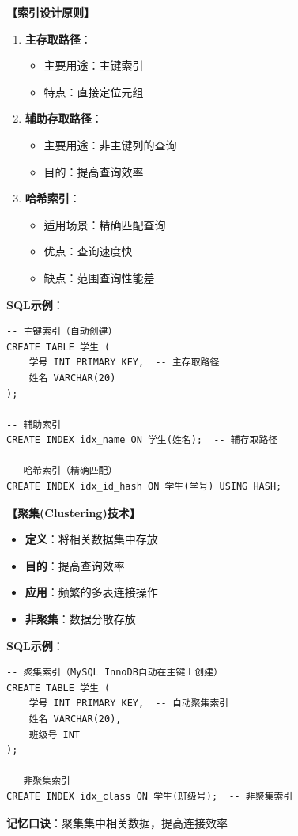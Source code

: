 \documentclass[12pt, a4paper]{article}
\newenvironment{bluebox}[1]{%
  \begin{trivlist}
  \item[\hskip\labelsep \textbf{#1}]
  \setlength{\parskip}{0.5ex}
  \setlength{\itemsep}{0.5ex}
}{%
  \end{trivlist}
  }
\begin{document}
\begin{bluebox}{索引设计}
	\textbf{【索引设计原则】}

	\begin{enumerate}[leftmargin=*, label=\textbf{\arabic*.}]
		\item \textbf{主存取路径}：
		      \begin{itemize}[nosep]
			      \item 主要用途：主键索引
			      \item 特点：直接定位元组
		      \end{itemize}

		\item \textbf{辅助存取路径}：
		      \begin{itemize}[nosep]
			      \item 主要用途：非主键列的查询
			      \item 目的：提高查询效率
		      \end{itemize}

		\item \textbf{哈希索引}：
		      \begin{itemize}[nosep]
			      \item 适用场景：精确匹配查询
			      \item 优点：查询速度快
			      \item 缺点：范围查询性能差
		      \end{itemize}
	\end{enumerate}

	\textbf{SQL示例}：
	\begin{verbatim}
-- 主键索引（自动创建）
CREATE TABLE 学生 (
    学号 INT PRIMARY KEY,  -- 主存取路径
    姓名 VARCHAR(20)
);

-- 辅助索引
CREATE INDEX idx_name ON 学生(姓名);  -- 辅存取路径

-- 哈希索引（精确匹配）
CREATE INDEX idx_id_hash ON 学生(学号) USING HASH;
	\end{verbatim}
\end{bluebox}

\begin{bluebox}{聚集技术}
	\textbf{【聚集(Clustering)技术】}

	\begin{itemize}[leftmargin=*, nosep]
		\item \textbf{定义}：将相关数据集中存放
		\item \textbf{目的}：提高查询效率
		\item \textbf{应用}：频繁的多表连接操作
		\item \textbf{非聚集}：数据分散存放
	\end{itemize}

	\textbf{SQL示例}：
	\begin{verbatim}
-- 聚集索引（MySQL InnoDB自动在主键上创建）
CREATE TABLE 学生 (
    学号 INT PRIMARY KEY,  -- 自动聚集索引
    姓名 VARCHAR(20),
    班级号 INT
);

-- 非聚集索引
CREATE INDEX idx_class ON 学生(班级号);  -- 非聚集索引
	\end{verbatim}

	\textbf{记忆口诀}：聚集集中相关数据，提高连接效率
\end{bluebox}
\end{document}
